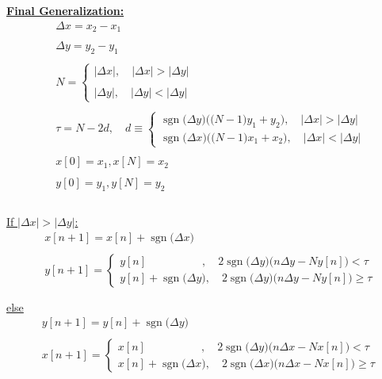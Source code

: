 \documentclass{article}
\DeclareMathOperator{\sgn}{sgn}
\begin{document}
\underline{\textbf{Final Generalization:}}
\begin{align*}
    &\Delta x = x_{2} - x_{1} \\ \\
    &\Delta y = y_{2} - y_{1} \\ \\
    &N = \begin{cases}
            |\Delta x|, \quad |\Delta x| > |\Delta y| \\ \\
            |\Delta y|, \quad |\Delta y| < |\Delta y|
           \end{cases} \\ \\  
    &\tau = N - 2d, \quad d \equiv \begin{cases}
                                        \sgn\big(\Delta y\big)\bigg(\big(N - 1\big)y_{1} + y_{2}\bigg), \quad |\Delta x| > |\Delta y| \\  
                                        \sgn\big(\Delta x\big)\bigg(\big(N - 1\big)x_{1} + x_{2}\bigg), \quad |\Delta x| < |\Delta y| 
                                     \end{cases} \\ \\
    &x[0] = x_{1}, x[N] = x_{2} \\ \\
    &y[0] = y_{1}, y[N] = y_{2} \\ \\
\end{align*}

\underline{If $|\Delta x| > |\Delta y|$:}
\begin{align*}
    &x[n + 1] = x[n] + \sgn\big(\Delta x\big) \\ \\ 
    &y[n + 1] = \begin{cases}
                    y[n] \quad \quad \quad \quad \quad, \quad 2\sgn\big(\Delta y\big)\Bigg(n\Delta y - Ny[n] \Bigg) < \tau \\
                    y[n] + \sgn\big(\Delta y\big), \quad 2\sgn\big(\Delta y\big)\Bigg(n\Delta y - Ny[n] \Bigg) \geq \tau
                  \end{cases} \\ \\ 
\end{align*}
\underline{else}
\begin{align*}
    &y[n + 1] = y[n] + \sgn\big(\Delta y\big) \\ \\ 
    &x[n + 1] = \begin{cases}
                    x[n] \quad \quad \quad \quad \quad, \quad 2\sgn\big(\Delta y\big)\Bigg(n\Delta x - Nx[n] \Bigg) < \tau \\
                    x[n] + \sgn\big(\Delta x\big), \quad 2\sgn\big(\Delta x\big)\Bigg(n\Delta x - Nx[n] \Bigg) \geq \tau
                  \end{cases} \\ \\ 
\end{align*}
\end{document}
